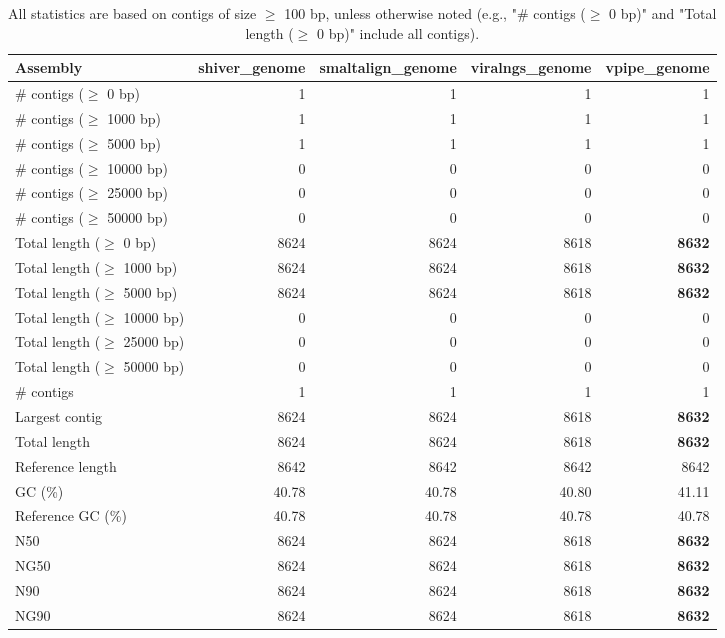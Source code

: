 \documentclass[12pt,a4paper]{article}
\begin{document}
\begin{table}[ht]
\begin{center}
\caption{All statistics are based on contigs of size $\geq$ 100 bp, unless otherwise noted (e.g., "\# contigs ($\geq$ 0 bp)" and "Total length ($\geq$ 0 bp)" include all contigs).}
\begin{tabular}{|l*{4}{|r}|}
\hline
Assembly & shiver\_genome & smaltalign\_genome & viralngs\_genome & vpipe\_genome \\ \hline
\# contigs ($\geq$ 0 bp) & 1 & 1 & 1 & 1 \\ \hline
\# contigs ($\geq$ 1000 bp) & 1 & 1 & 1 & 1 \\ \hline
\# contigs ($\geq$ 5000 bp) & 1 & 1 & 1 & 1 \\ \hline
\# contigs ($\geq$ 10000 bp) & 0 & 0 & 0 & 0 \\ \hline
\# contigs ($\geq$ 25000 bp) & 0 & 0 & 0 & 0 \\ \hline
\# contigs ($\geq$ 50000 bp) & 0 & 0 & 0 & 0 \\ \hline
Total length ($\geq$ 0 bp) & 8624 & 8624 & 8618 & {\bf 8632} \\ \hline
Total length ($\geq$ 1000 bp) & 8624 & 8624 & 8618 & {\bf 8632} \\ \hline
Total length ($\geq$ 5000 bp) & 8624 & 8624 & 8618 & {\bf 8632} \\ \hline
Total length ($\geq$ 10000 bp) & 0 & 0 & 0 & 0 \\ \hline
Total length ($\geq$ 25000 bp) & 0 & 0 & 0 & 0 \\ \hline
Total length ($\geq$ 50000 bp) & 0 & 0 & 0 & 0 \\ \hline
\# contigs & 1 & 1 & 1 & 1 \\ \hline
Largest contig & 8624 & 8624 & 8618 & {\bf 8632} \\ \hline
Total length & 8624 & 8624 & 8618 & {\bf 8632} \\ \hline
Reference length & 8642 & 8642 & 8642 & 8642 \\ \hline
GC (\%) & 40.78 & 40.78 & 40.80 & 41.11 \\ \hline
Reference GC (\%) & 40.78 & 40.78 & 40.78 & 40.78 \\ \hline
N50 & 8624 & 8624 & 8618 & {\bf 8632} \\ \hline
NG50 & 8624 & 8624 & 8618 & {\bf 8632} \\ \hline
N90 & 8624 & 8624 & 8618 & {\bf 8632} \\ \hline
NG90 & 8624 & 8624 & 8618 & {\bf 8632} \\ \hline

\end{tabular}
\end{center}
\end{table}
\end{document}

